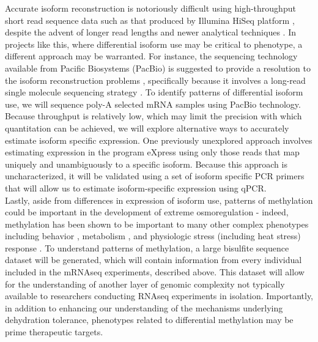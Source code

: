 \documentclass[11pt]{article}
\begin{document}
Accurate isoform reconstruction is notoriously difficult using high-throughput short read sequence data such as that produced by Illumina HiSeq platform \citep{Pyrkosz:2013tm,Hiller:2009be}, despite the advent of longer read lengths and newer analytical techniques \citep{LeGault:2013gw,Jiang:2009bw}. In projects like this, where differential isoform use may be critical to phenotype, a different approach may be warranted. For instance, the sequencing technology available from Pacific Biosystems (PacBio) is suggested to provide a resolution to the isoform reconstruction problems \citep{Au:2013hp}, specifically because it involves a long-read single molecule sequencing strategy \citep{Eid:2009kva}.  To identify patterns of differential isoform use, we will sequence poly-A selected mRNA samples using PacBio technology. Because throughput is relatively low, which may limit the precision with which quantitation can be achieved, we will explore alternative ways to accurately estimate isoform specific expression. One previously unexplored approach involves estimating expression in the program eXpress \citep{Roberts:2012dh} using only those reads that map uniquely and unambiguously to a specific isoform. Because this approach is uncharacterized, it will be validated using a set of isoform specific PCR primers that will allow us to estimate isoform-specific expression using qPCR.   \\ 

Lastly, aside from differences in expression of isoform use, patterns of methylation could be important in the development of extreme osmoregulation - indeed, methylation has been shown to be important to many other complex phenotypes including behavior \citep{Lyko:2010dra}, metabolism \citep{Foret:2012jf}, and physiologic stress (including heat stress) response \citep{Sonna:2002dc}. To understand patterns of methylation, a large bisulfite sequence dataset will be generated, which will contain information from every individual included in the mRNAseq experiments, described above. This dataset will allow for the understanding of another layer of genomic complexity not typically available to researchers conducting RNAseq experiments in isolation. Importantly, in addition to enhancing our understanding of the mechanisms underlying dehydration tolerance, phenotypes related to differential methylation may be prime therapeutic targets.    \\


\end{document}
